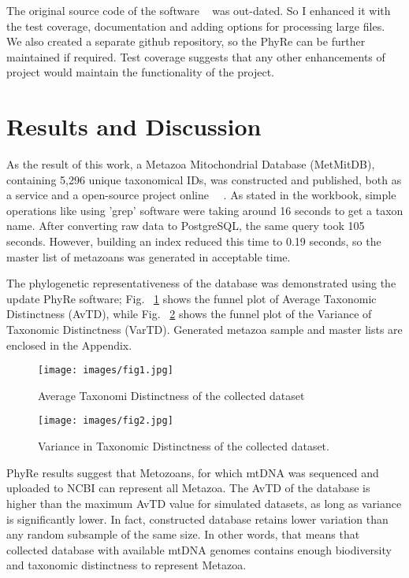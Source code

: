 \documentclass[a4paper,11pt]{article}
\begin{document}
The original source code of the software ~\cite{plazzi2010phylogenetic, phyre} was out-dated. So I enhanced it with the test coverage, documentation and adding options for processing large files. We also created a separate github repository, so the PhyRe can be further maintained if required. Test coverage suggests that any other enhancements of project would maintain the functionality of the project.

\clearpage
\section{Results and Discussion}
As the result of this work, a Metazoa Mitochondrial Database (MetMitDB), containing 5,296 unique taxonomical IDs, was constructed and published, both as a service and a open-source project online ~~\cite{metmitdb, metmitdbgithub}.  As stated in the workbook, simple operations like using 'grep' software were taking around 16 seconds  to get a taxon name. After converting raw data to PostgreSQL, the same query took 105 seconds. However, building an index reduced this time to 0.19 seconds, so the master list of metazoans was generated in acceptable time.

The phylogenetic representativeness of the database was demonstrated using the update PhyRe software; Fig. ~\ref{fig:figATD} shows the funnel plot of Average Taxonomic Distinctness (AvTD), while Fig. ~\ref{fig:figVTD} shows the funnel plot of the Variance of Taxonomic Distinctness (VarTD). Generated metazoa sample and master lists are enclosed in the Appendix.

\begin{figure}[ht!]
\begin{center}
\texttt{[image: images/fig1.jpg]}
\caption{Average Taxonomi Distinctness of the collected dataset}\label{fig:figATD}
\end{center}
\end{figure}

\begin{figure}[ht!]
\begin{center}
\texttt{[image: images/fig2.jpg]}
\caption{Variance in Taxonomic Distinctness of the collected dataset.}\label{fig:figVTD}
\end{center}
\end{figure}

PhyRe results suggest that Metozoans, for which mtDNA was sequenced and uploaded to NCBI can represent all Metazoa. The AvTD of the database is higher than the maximum AvTD value for simulated datasets, as long as variance is significantly lower. In fact, constructed database retains lower variation than any random subsample of the same size. In other words, that means that collected database with available mtDNA genomes contains enough biodiversity and taxonomic distinctness to represent Metazoa.
\end{document}
